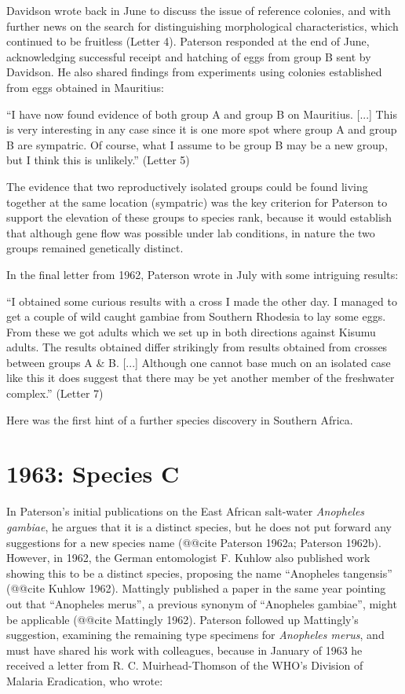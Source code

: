 \documentclass[a4paper,11pt,abstracton,hidelinks]{scrartcl}
\begin{document}
Davidson wrote back in June to discuss the issue of reference colonies, and with further news on the search for distinguishing morphological characteristics, which continued to be fruitless (Letter 4).
%
Paterson responded at the end of June, acknowledging successful receipt and hatching of eggs from group B sent by Davidson.
%
He also shared findings from experiments using colonies established from eggs obtained in Mauritius:
\begin{displayquote}
``I have now found evidence of both group A and group B on Mauritius. [...] 
%
This is very interesting in any case since it is one more spot where group A and group B are sympatric.
%
Of course, what I assume to be group B may be a new group, but I think this is unlikely.'' (Letter 5)
\end{displayquote}
The evidence that two reproductively isolated groups could be found living together at the same location (sympatric) was the key criterion for Paterson to support the elevation of these groups to species rank, because it would establish that although gene flow was possible under lab conditions, in nature the two groups remained genetically distinct.


In the final letter from 1962, Paterson wrote in July with some intriguing results:
\begin{displayquote}
``I obtained some curious results with a cross I made the other day. I managed to get a couple of wild caught gambiae from Southern Rhodesia to lay some eggs. From these we got adults which we set up in both directions against Kisumu adults. The results obtained differ strikingly from results obtained from crosses between groups A \& B. [...] Although one cannot base much on an isolated case like this it does suggest that there may be yet another member of the freshwater complex.'' (Letter 7)
\end{displayquote}
%
Here was the first hint of a further species discovery in Southern Africa.


\section{1963: Species C}


In Paterson's initial publications on the East African salt-water \textit{Anopheles gambiae}, he argues that it is a distinct species, but he does not put forward any suggestions for a new species name (@@cite Paterson 1962a; Paterson 1962b). However, in 1962, the German entomologist F. Kuhlow also published work showing this to be a distinct species, proposing the name ``Anopheles tangensis'' (@@cite Kuhlow 1962). Mattingly published a paper in the same year pointing out that ``Anopheles merus'', a previous synonym of ``Anopheles gambiae'', might be applicable (@@cite Mattingly 1962). Paterson followed up Mattingly's suggestion, examining the remaining type specimens for \textit{Anopheles merus}, and must have shared his work with colleagues, because in January of 1963 he received a letter from R. C. Muirhead-Thomson of the WHO's Division of Malaria Eradication, who wrote:
\end{document}
